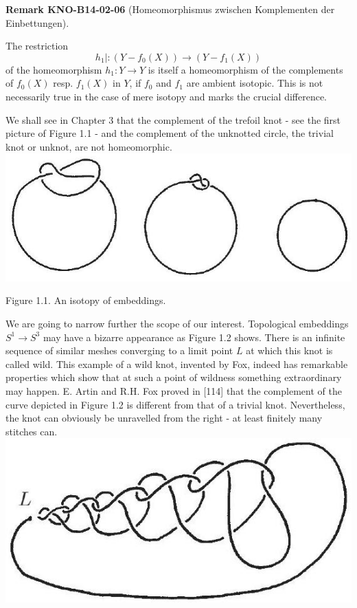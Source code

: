 \documentclass[10pt, letterpaper]{article}
\newcommand{\CustomHeading}[3]{%
  \par\medskip\noindent%
  \textbf{#1 #2} \textnormal{(#3)}.\enskip%
}
\newenvironment{REM}[2]{\begin{unitbox}\CustomHeading{Remark}{#1}{#2}}{\end{unitbox}}
\begin{document}
\begin{REM}{KNO-B14-02-06}{Homeomorphismus zwischen Komplementen der Einbettungen}
The restriction
$$
h_{1} \mid:\left(Y-f_{0}(X)\right) \rightarrow\left(Y-f_{1}(X)\right)
$$
of the homeomorphism $h_{1}: Y \rightarrow Y$ is itself a homeomorphism of the complements of $f_{0}(X)$ resp. $f_{1}(X)$ in $Y$, if $f_{0}$ and $f_{1}$ are ambient isotopic. This is not necessarily true in the case of mere isotopy and marks the crucial difference.
\end{REM}

We shall see in Chapter 3 that the complement of the trefoil knot - see the first picture of Figure 1.1 - and the complement of the unknotted circle, the trivial knot or unknot, are not homeomorphic.\\
\includegraphics[scale=0.2, center]{2025_05_21_9c06be8de7a55410f8c1g-016}

Figure 1.1. An isotopy of embeddings.

We are going to narrow further the scope of our interest. Topological embeddings $S^{1} \rightarrow S^{3}$ may have a bizarre appearance as Figure 1.2 shows. There is an infinite sequence of similar meshes converging to a limit point $L$ at which this knot is called wild. This example of a wild knot, invented by Fox, indeed has remarkable properties which show that at such a point of wildness something extraordinary may happen. E. Artin and R.H. Fox proved in [114] that the complement of the curve depicted in Figure 1.2 is different from that of a trivial knot. Nevertheless, the knot can obviously be unravelled from the right - at least finitely many stitches can.\\
\includegraphics[scale=0.2, center]{2025_05_21_9c06be8de7a55410f8c1g-017}
\end{document}
